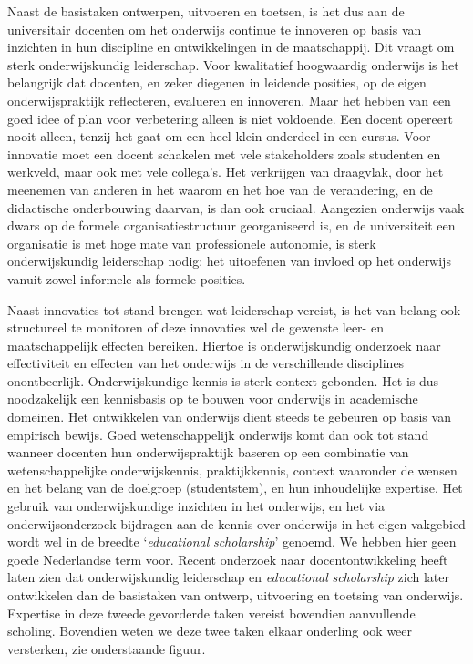 \documentclass[smallauthor, chapterhaspagenum, nochapterinheader, pagenuminheader,  bigchapnum,medium2, tocpages, garamond, titleinheader]{jote-book}
\begin{document}
	Naast de basistaken ontwerpen, uitvoeren en toetsen, is het dus aan de universitair docenten om het onderwijs continue te innoveren op basis van inzichten in hun discipline en ontwikkelingen in de maatschappij. Dit vraagt om sterk onderwijskundig leiderschap. Voor kwalitatief hoogwaardig onderwijs is het belangrijk dat docenten, en zeker diegenen in leidende posities, op de eigen onderwijspraktijk reflecteren, evalueren en innoveren. Maar het hebben van een goed idee of plan voor verbetering alleen is niet voldoende. Een docent opereert nooit alleen, tenzij het gaat om een heel klein onderdeel in een cursus. Voor innovatie moet een docent schakelen met vele stakeholders zoals studenten en werkveld, maar ook met vele collega's. Het verkrijgen van draagvlak, door het meenemen van anderen in het waarom en het hoe van de verandering, en de didactische onderbouwing daarvan, is dan ook cruciaal. Aangezien onderwijs vaak dwars op de formele organisatiestructuur georganiseerd is, en de universiteit een organisatie is met hoge mate van professionele autonomie, is sterk onderwijskundig leiderschap nodig: het uitoefenen van invloed op het onderwijs vanuit zowel informele als formele posities.



	Naast innovaties tot stand brengen wat leiderschap vereist, is het van belang ook structureel te monitoren of deze innovaties wel de gewenste leer- en maatschappelijk effecten bereiken. Hiertoe is onderwijskundig onderzoek naar effectiviteit en effecten van het onderwijs in de verschillende disciplines onontbeerlijk. Onderwijskundige kennis is sterk context-gebonden. Het is dus noodzakelijk een kennisbasis op te bouwen voor onderwijs in academische domeinen. Het ontwikkelen van onderwijs dient steeds te gebeuren op basis van empirisch bewijs. Goed wetenschappelijk onderwijs komt dan ook tot stand wanneer docenten hun onderwijspraktijk baseren op een combinatie van wetenschappelijke onderwijskennis, praktijkkennis, context waaronder de wensen en het belang van de doelgroep (studentstem), en hun inhoudelijke expertise. Het gebruik van onderwijskundige inzichten in het onderwijs, en het via onderwijsonderzoek bijdragen aan de kennis over onderwijs in het eigen vakgebied wordt wel in de breedte ‘\emph{educational}\emph{ }\emph{scholarship}' genoemd. We hebben hier geen goede Nederlandse term voor. Recent onderzoek naar docentontwikkeling heeft laten zien dat onderwijskundig leiderschap en \emph{educational}\emph{ }\emph{scholarship} zich later ontwikkelen dan de basistaken van ontwerp, uitvoering en toetsing van onderwijs. Expertise in deze tweede gevorderde taken vereist bovendien aanvullende scholing. Bovendien weten we deze twee taken elkaar onderling ook weer versterken, zie onderstaande figuur.
\end{document}
